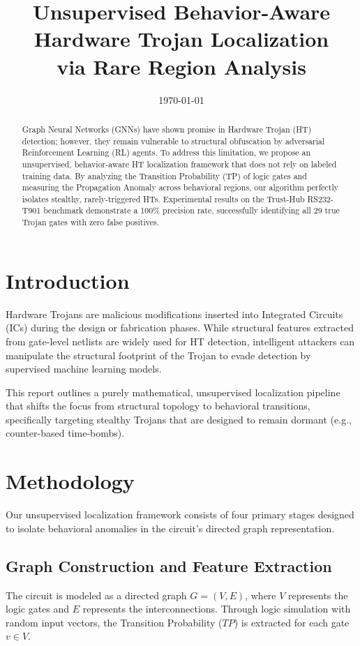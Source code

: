 \documentclass[11pt,a4paper]{article}
\title{Unsupervised Behavior-Aware Hardware Trojan Localization \\ via Rare Region Analysis}
\author{}
\date{\today}
\begin{document}
\maketitle

\begin{abstract}
Graph Neural Networks (GNNs) have shown promise in Hardware Trojan (HT) detection; however, they remain vulnerable to structural obfuscation by adversarial Reinforcement Learning (RL) agents. To address this limitation, we propose an unsupervised, behavior-aware HT localization framework that does not rely on labeled training data. By analyzing the Transition Probability (TP) of logic gates and measuring the Propagation Anomaly across behavioral regions, our algorithm perfectly isolates stealthy, rarely-triggered HTs. Experimental results on the Trust-Hub RS232-T901 benchmark demonstrate a 100\% precision rate, successfully identifying all 29 true Trojan gates with zero false positives.
\end{abstract}

\section{Introduction}
Hardware Trojans are malicious modifications inserted into Integrated Circuits (ICs) during the design or fabrication phases. While structural features extracted from gate-level netlists are widely used for HT detection, intelligent attackers can manipulate the structural footprint of the Trojan to evade detection by supervised machine learning models. 

This report outlines a purely mathematical, unsupervised localization pipeline that shifts the focus from structural topology to behavioral transitions, specifically targeting stealthy Trojans that are designed to remain dormant (e.g., counter-based time-bombs).

\section{Methodology}
Our unsupervised localization framework consists of four primary stages designed to isolate behavioral anomalies in the circuit's directed graph representation.

\subsection{Graph Construction and Feature Extraction}
The circuit is modeled as a directed graph $G = (V, E)$, where $V$ represents the logic gates and $E$ represents the interconnections. Through logic simulation with random input vectors, the Transition Probability ($TP$) is extracted for each gate $v \in V$.
\end{document}
